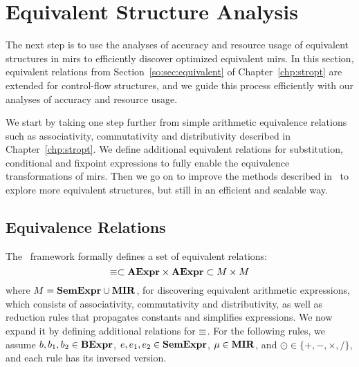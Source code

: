 \section{Equivalent Structure Analysis}
\label{po:sec:equivalence_analysis}

The next step is to use the analyses of accuracy and resource usage of
equivalent structures in \glspl{mir} to efficiently discover optimized
equivalent \glspl{mir}.  In this section, equivalent relations from
Section~\ref{so:sec:equivalent} of Chapter~\ref{chp:stropt} are extended
for control-flow structures, and we guide this process efficiently with our
analyses of accuracy and resource usage.

We start by taking one step further from simple arithmetic equivalence
relations such as associativity, commutativity and distributivity described
in Chapter~\ref{chp:stropt}.  We define additional equivalent relations
for substitution, conditional and fixpoint expressions to fully enable the
equivalence transformations of \glspl{mir}.  Then we go on to improve the
methods described in \soap~to explore more equivalent structures, but still in
an efficient and scalable way.

\subsection{Equivalence Relations}

The \soap~framework formally defines a set of equivalent relations:
\begin{equation}
    \equiv \subset \mathbf{AExpr} \times \mathbf{AExpr} \subset M \times M
\end{equation}
where $M = \mathbf{SemExpr} \cup \mathbf{MIR}$, for discovering equivalent arithmetic
expressions, which consists of associativity, commutativity and distributivity,
as well as reduction rules that propagates constants and simplifies
expressions.  We now expand it by defining additional relations for $\equiv$.
For the following rules, we assume $b, b_1, b_2 \in \mathbf{BExpr}$, $e, e_1, e_2
\in \mathbf{SemExpr}$, $\mu \in \mathbf{MIR}$, and $\odot \in \{+, -, \times, /\}$, and
each rule has its inversed version.


